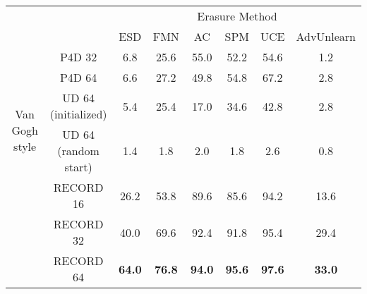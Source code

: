 \begin{tabular}{c|c|c|c|c|c|c|c}
    \toprule
     && \multicolumn{6}{c}{Erasure Method} \\
        \cmidrule(lr){3-8} 
        && ESD & FMN & AC & SPM & UCE & AdvUnlearn \\
        \midrule
        \multirow{5}{*}{Van Gogh style}         
        & P4D 32 & 6.8 & 25.6 & 55.0 & 52.2 & 54.6 & 1.2 \\
        & P4D 64 & 6.6 & 27.2 & 49.8 & 54.8 & 67.2 & 2.8 \\
        & UD 64 (initialized) & 5.4 & 25.4 & 17.0 & 34.6 & 42.8 & 2.8 \\
        & UD 64 (random start) & 1.4 & 1.8 & 2.0 & 1.8 & 2.6 & 0.8  \\
        & RECORD 16 & 26.2 & 53.8 & 89.6 & 85.6 & 94.2 & 13.6 \\
        & RECORD 32 & 40.0 & 69.6 & 92.4 & 91.8 & 95.4 & 29.4 \\
        & RECORD 64 & \textbf{64.0} & \textbf{76.8} & \textbf{94.0} & \textbf{95.6} & \textbf{97.6} & \textbf{33.0} \\
        \bottomrule

    \end{tabular}